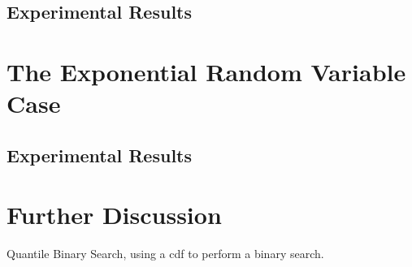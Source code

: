 \documentclass{article}
\begin{document}
\subsection*{Experimental Results}

\section*{The Exponential Random Variable Case}

\subsection*{Experimental Results}

\section*{Further Discussion}
Quantile Binary Search, using a cdf to perform a binary search.
\end{document}
